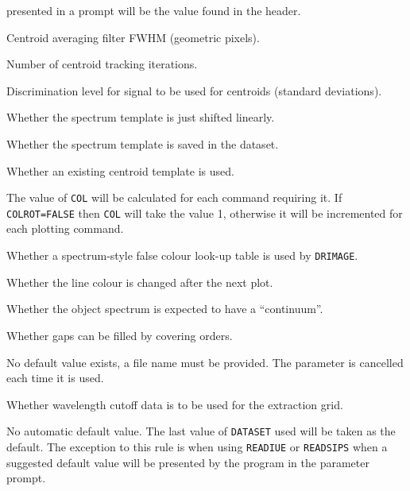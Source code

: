 \begin {description}
   presented in a prompt will be the value found in the header.
\item [\htmlref{CENAV}{CENAV} = 30.0] \lmbox
   Centroid averaging filter FWHM (geometric pixels).
\item [\htmlref{CENIT}{CENIT} = 1] \lmbox
   Number of centroid tracking iterations.
\item [\htmlref{CENSD}{CENSD} = 4.0] \lmbox
   Discrimination level for signal to be used for centroids
   (standard deviations).
\item [\htmlref{CENSH}{CENSH} = FALSE] \lmbox
   Whether the spectrum template is just shifted linearly.
\item [\htmlref{CENSV}{CENSV} = FALSE] \lmbox
   Whether the spectrum template is saved in the dataset.
\item [\htmlref{CENTM}{CENTM} = FALSE] \lmbox
   Whether an existing centroid template is used.
\item [\htmlref{COL}{COL} (= 1)] \lmbox
   The value of \verb+COL+ will be calculated for each command requiring it.
   If \verb+COLROT=FALSE+ then \verb+COL+ will take the value 1, otherwise it
   will be incremented for each plotting command.
\item [\htmlref{COLOUR}{COLOUR} = FALSE] \lmbox
   Whether a spectrum-style false colour look-up table is used by
   \verb+DRIMAGE+\@.
\item [\htmlref{COLROT}{COLROT} = TRUE] \lmbox
   Whether the line colour is changed after the next plot.
\item [\htmlref{CONTINUUM}{CONTINUUM} = TRUE] \lmbox
   Whether the object spectrum is expected to have a ``continuum''.
\item [\htmlref{COVERGAP}{COVERGAP} = FALSE] \lmbox
   Whether gaps can be filled by covering orders.
\item [\htmlref{CUTFILE}{CUTFILE}] \lmbox
   No default value exists, a file name must be provided.
   The parameter is cancelled each time it is used.
\item [\htmlref{CUTWV}{CUTWV} = TRUE] \lmbox
   Whether wavelength cutoff data is to be used for the extraction grid.
\item [\htmlref{DATASET}{DATASET}] \lmbox
   No automatic default value.  The last value of \verb+DATASET+ used will be
   taken as the default.  The exception to this rule is when using
   \verb+READIUE+ or \verb+READSIPS+ when a suggested default value will be
   presented by the program in the parameter prompt.
\item [\htmlref{DAY}{DAY}] \lmbox

\end{description}
